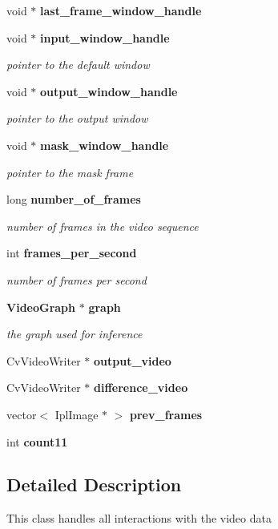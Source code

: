 \begin{CompactItemize}
void $\ast$ {\bf last\_\-frame\_\-window\_\-handle}
\item 
void $\ast$ {\bf input\_\-window\_\-handle}
\begin{CompactList}\small\item\em pointer to the default window \item\end{CompactList}\item 
void $\ast$ {\bf output\_\-window\_\-handle}
\begin{CompactList}\small\item\em pointer to the output window \item\end{CompactList}\item 
void $\ast$ {\bf mask\_\-window\_\-handle}
\begin{CompactList}\small\item\em pointer to the mask frame \item\end{CompactList}\item 
long {\bf number\_\-of\_\-frames}
\begin{CompactList}\small\item\em number of frames in the video sequence \item\end{CompactList}\item 
int {\bf frames\_\-per\_\-second}
\begin{CompactList}\small\item\em number of frames per second \item\end{CompactList}\item 
{\bf VideoGraph} $\ast$ {\bf graph}
\begin{CompactList}\small\item\em the graph used for inference \item\end{CompactList}\item 
CvVideoWriter $\ast$ {\bf output\_\-video}
\item 
CvVideoWriter $\ast$ {\bf difference\_\-video}
\item 
vector$<$ IplImage $\ast$ $>$ {\bf prev\_\-frames}
\item 
int {\bf count11}
\end{CompactItemize}


\subsection{Detailed Description}
This class handles all interactions with the video data 



